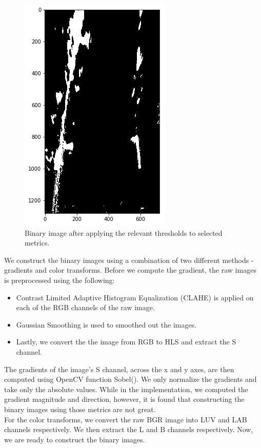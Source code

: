 \documentclass[12pt,twoside]{article}
\begin{document}
\begin{figure}[H]
	\begin{center}
		\includegraphics[width = 0.4\hsize]{./figures/Threshold.png} 
		\caption{Binary image after applying the relevant thresholds to selected metrics.} %
		\label{fig:binaryimage} %
	\end{center}
\end{figure} 
We construct the binary images using a combination of two different methods - gradients and color transforms. Before we compute the gradient, the raw images is preprocessed using the following:
\begin{itemize}
	\item Contrast Limited Adaptive Histogram Equalization (CLAHE) is applied on each of the RGB channels of the raw image. 
	\item Gaussian Smoothing is used to smoothed out the images.
	\item Lastly, we convert the the image from RGB to HLS and extract the S channel.
\end{itemize}
The gradients of the image's S channel, across the x and y axes, are then computed using OpenCV function Sobel(). We only normalize the gradients and take only the absolute values. While in the implementation, we computed the gradient magnitude and direction, however, it is found that constructing the binary images using those metrics are not great. \\

For the color transforms, we convert the raw BGR image into LUV and LAB channels respectively. We then extract the L and B channels respectively. Now, we are ready to construct the binary images.\\
\end{document}
